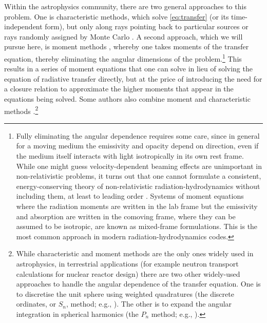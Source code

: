 \documentclass[fleqn,usenatbib]{mnras}
\begin{document}
Within the astrophysics community, there are two general approaches to this problem. One is characteristic methods, which solve \autoref{eq:transfer} (or its time-independent form), but only along rays pointing back to particular sources \citep[e.g.,][]{Abel02a, Rijkhorst06a, Krumholz07f} or rays randomly assigned by Monte Carlo \citep[e.g.,][]{Fleck71a, Tsang15a}. A second approach, which we will pursue here, is moment methods \citep[e.g.,][]{Mihalas_1984,Castor_2004}, whereby one takes moments of the transfer equation, thereby eliminating the angular dimensions of the problem.\footnote{Fully eliminating the angular dependence requires some care, since in general for a moving medium the emissivity and opacity depend on direction, even if the medium itself interacts with light isotropically in its own rest frame. While one might guess velocity-dependent beaming effects are unimportant in non-relativistic problems, it turns out that one cannot formulate a consistent, energy-conserving theory of non-relativistic radiation-hydrodynamics without including them, at least to leading order \citep{Mihalas82a, Lowrie99a, Krumholz_2007}. Systems of moment equations where the radiation moments are written in the lab frame but the emissivity and absorption are written in the comoving frame, where they can be assumed to be isotropic, are known as mixed-frame formulations. This is the most common approach in modern radiation-hydrodynamics codes.} This results in a series of moment equations that one can solve in lieu of solving the equation of radiative transfer directly, but at the price of introducing the need for a closure relation to approximate the higher moments that appear in the equations being solved. Some authors also combine moment and characteristic methods \citep[e.g.,][]{Rosen17a}.\footnote{While characteristic and moment methods are the only ones widely used in astrophysics, in terrestrial applications (for example neutron transport calculations for nuclear reactor design) there are two other widely-used approaches to handle the angular dependence of the transfer equation. One is to discretise the unit sphere using weighted quadratures (the discrete ordinates, or $S_n$, method; e.g., \citealt{Lathrop_1964,Adams97a}). The other is to expand the angular integration in spherical harmonics (the $P_n$ method; e.g., \citealt{Modest89a}).}
\end{document}

